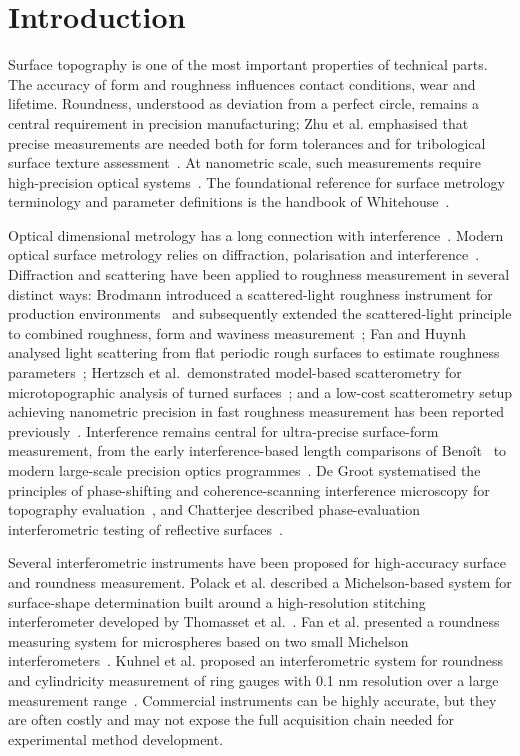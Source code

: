 \documentclass[review]{elsarticle}
\begin{document}
\linenumbers

\section{Introduction}
Surface topography is one of the most important properties of technical parts. The accuracy of form and roughness influences contact conditions, wear and lifetime. Roundness, understood as deviation from a perfect circle, remains a central requirement in precision manufacturing; Zhu et al. emphasised that precise measurements are needed both for form tolerances and for tribological surface texture assessment~\cite{Zhu2019}. At nanometric scale, such measurements require high-precision optical systems~\cite{Leach2011}. The foundational reference for surface metrology terminology and parameter definitions is the handbook of Whitehouse~\cite{Whitehouse2011}.

Optical dimensional metrology has a long connection with interference~\cite{MICHELSON1893}. Modern optical surface metrology relies on diffraction, polarisation and interference~\cite{Jenkins1976,Born2000}. Diffraction and scattering have been applied to roughness measurement in several distinct ways: Brodmann introduced a scattered-light roughness instrument for production environments~\cite{Brodmann1984} and subsequently extended the scattered-light principle to combined roughness, form and waviness measurement~\cite{Brodmann1986}; Fan and Huynh analysed light scattering from flat periodic rough surfaces to estimate roughness parameters~\cite{Fan1994}; Hertzsch et al.\ demonstrated model-based scatterometry for microtopographic analysis of turned surfaces~\cite{Hertzsch2002}; and a low-cost scatterometry setup achieving nanometric precision in fast roughness measurement has been reported previously~\cite{Kucharski_D._A_2020}. Interference remains central for ultra-precise surface-form measurement, from the early interference-based length comparisons of Beno\^{i}t~\cite{Benoit1898} to modern large-scale precision optics programmes~\cite{Xue-fei2015}. De Groot systematised the principles of phase-shifting and coherence-scanning interference microscopy for topography evaluation~\cite{DeGroot2011a,deGroot2014}, and Chatterjee described phase-evaluation interferometric testing of reflective surfaces~\cite{Chatterjee:2015phase}.

Several interferometric instruments have been proposed for high-accuracy surface and roundness measurement. Polack et al. described a Michelson-based system for surface-shape determination built around a high-resolution stitching interferometer developed by Thomasset et al.~\cite{Polack2019,Thomasset2013}. Fan et al. presented a roundness measuring system for microspheres based on two small Michelson interferometers~\cite{Fan2014}. Kuhnel et al. proposed an interferometric system for roundness and cylindricity measurement of ring gauges with 0.1 nm resolution over a large measurement range~\cite{Kuhnel2012}. Commercial instruments can be highly accurate, but they are often costly and may not expose the full acquisition chain needed for experimental method development. 
\end{document}
